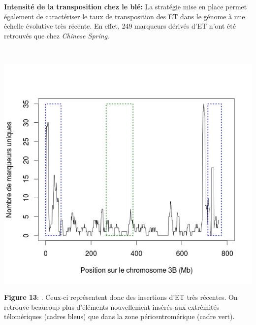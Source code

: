 \documentclass[a4paper, 12pt]{article}
\begin{document}
\begin{onehalfspace}
\textbf{Intensité de la transposition chez le blé:} La stratégie mise en place permet également de caractériser le taux de transposition des ET dans le génome à une échelle évolutive très récente. En effet, 249 marqueurs dérivés d'ET n'ont été retrouvés que chez \textit{Chinese Spring}. 

\newpage
\thispagestyle{empty}
~ \vfill
\begin{multicols}{3}
\begin{center}
\includegraphics[scale=0.3]{pic_Data/fig12.jpeg}\\
\end{center}
\textbf{Figure 13}: . Ceux-ci représentent donc des insertions d'ET très récentes. On retrouve beaucoup plus d'éléments nouvellement insérés aux extrémités télomériques (cadres bleus) que dans la zone péricentromérique (cadre vert).\\ ~\\ ~\\ ~\\ ~\\ ~\\ ~\\


\end{multicols}
\end{onehalfspace}
\end{document}
